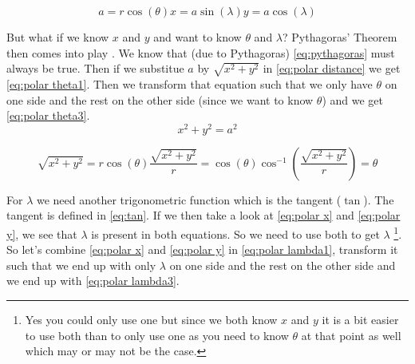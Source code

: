 \begin{subequations}
    \begin{equation}
        a = r \cos(\theta)
        \label{eq:polar distance}
    \end{equation}
    \begin{equation}
        x = a \sin(\lambda)
        \label{eq:polar x}
    \end{equation}
    \begin{equation}
        y = a \cos(\lambda)
        \label{eq:polar y}
    \end{equation}
\end{subequations}

But what if we know $x$ and $y$ and want to know $\theta$ and $\lambda$? Pythagoras' Theorem then comes into play \cite{pythagoras}. We know that (due to Pythagoras) \autoref{eq:pythagoras} must 
always be true. Then if we substitue $a$ by $\sqrt{x^2 + y^2}$ in \autoref{eq:polar distance} we get \autoref{eq:polar theta1}. Then we transform that equation such that we only have $\theta$ on 
one side and the rest on the other side (since we want to know $\theta$) and we get \autoref{eq:polar theta3}.
\begin{equation}
    x^2 + y^2 = a^2
    \label{eq:pythagoras}
\end{equation}

\begin{subequations}
    \begin{equation}
        \sqrt{x^2 + y^2} = r\cos(\theta)
        \label{eq:polar theta1}
    \end{equation}
    \begin{equation}
        \frac{\sqrt{x^2 + y^2}}{r} = \cos(\theta)
        \label{eq:polar theta2}
    \end{equation}
    \begin{equation}
        \cos^{-1}(\frac{\sqrt{x^2 + y^2}}{r}) = \theta
        \label{eq:polar theta3}
    \end{equation}
\end{subequations}

For $\lambda$ we need another trigonometric function which is the tangent ($\tan$). The tangent is defined in \autoref{eq:tan}. If we then take a look at \autoref{eq:polar x} and 
\autoref{eq:polar y}, we see that $\lambda$ is present in both equations. So we need to use both to get $\lambda$ \footnote{Yes you could only use one but since we both know $x$ and $y$ it is a
bit easier to use both than to only use one as you need to know $\theta$ at that point as well which may or may not be the case.}. So let's combine \autoref{eq:polar x} and \autoref{eq:polar y}
in \autoref{eq:polar lambda1}, transform it such that we end up with only $\lambda$ on one side and the rest on the other side and we end up with \autoref{eq:polar lambda3}.

